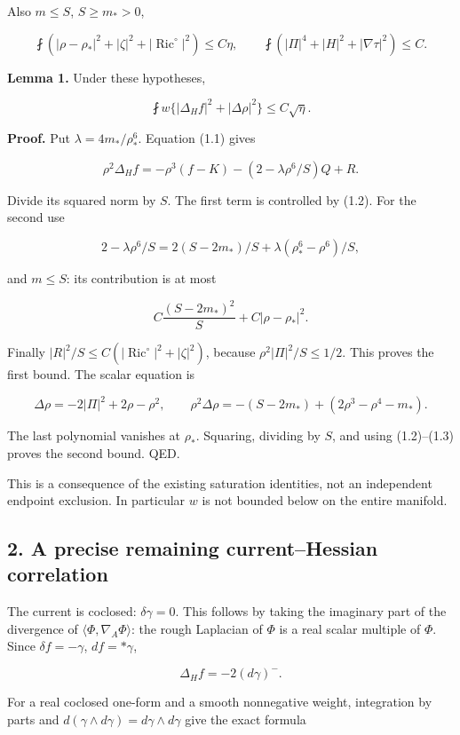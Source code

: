 \documentclass[
  10pt,
]{article}
\begin{document}
Also \(m\le S\), \(S\ge m_*>0\),

\[
 \fint(|\rho-\rho_*|^2+|\zeta|^2+|\operatorname{Ric}^{\circ}|^2)
 \le C\eta,\qquad
 \fint(|\Pi|^4+|H|^2+|\nabla\tau|^2)\le C.
 \tag{1.3}
\]

\textbf{Lemma 1.} Under these hypotheses,

\[
 \boxed{\fint w\{ |\Delta_Hf|^2+|\Delta\rho|^2\}\le C\sqrt\eta.}
 \tag{1.4}
\]

\textbf{Proof.} Put \(\lambda=4m_*/\rho_*^6\). Equation (1.1) gives

\[
 \rho^2\Delta_Hf=-\rho^3(f-K)
                 -(2-\lambda\rho^6/S)Q+R.
\]

Divide its squared norm by \(S\). The first term is controlled by (1.2).
For the second use

\[
 2-\lambda\rho^6/S
 =2(S-2m_*)/S+\lambda(\rho_*^6-\rho^6)/S,
\]

and \(m\le S\): its contribution is at most

\[
 C\frac{(S-2m_*)^2}{S}+C|\rho-\rho_*|^2.
\]

Finally \(|R|^2/S\le C(|\operatorname{Ric}^{\circ}|^2+|\zeta|^2)\),
because \(\rho^2|\Pi|^2/S\le1/2\). This proves the first bound. The
scalar equation is

\[
 \Delta\rho=-2|\Pi|^2+2\rho-\rho^2,
 \qquad
 \rho^2\Delta\rho=-(S-2m_*)+(2\rho^3-\rho^4-m_*).
\]

The last polynomial vanishes at \(\rho_*\). Squaring, dividing by \(S\),
and using (1.2)--(1.3) proves the second bound. QED.

This is a consequence of the existing saturation identities, not an
independent endpoint exclusion. In particular \(w\) is not bounded below
on the entire manifold.

\hypertarget{a-precise-remaining-currenthessian-correlation}{%
\subsection{2. A precise remaining current--Hessian
correlation}\label{a-precise-remaining-currenthessian-correlation}}

The current is coclosed: \(\delta\gamma=0\). This follows by taking the
imaginary part of the divergence of \(\langle\Phi,\nabla_A\Phi\rangle\):
the rough Laplacian of \(\Phi\) is a real scalar multiple of \(\Phi\).
Since \(\delta f=-\gamma\), \(df=*\gamma\),

\[
 \Delta_H f=-2(d\gamma)^-.
 \tag{2.1}
\]

For a real coclosed one-form and a smooth nonnegative weight,
integration by parts and
\(d(\gamma\wedge d\gamma)=d\gamma\wedge d\gamma\) give the exact formula
\end{document}
